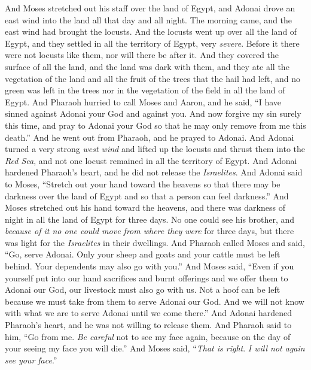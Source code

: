 \begin{biblechapter}
\verse And Moses stretched out his staff over the land of Egypt, and Adonai drove an east wind into the land all that day and all night. The morning came, and the east wind had brought the locusts.
\verse And the locusts went up over all the land of Egypt, and they settled in all the territory of Egypt, very \textit{severe}. Before it there were not locusts like them, nor will there be after it.
\verse And they covered the surface of all the land, and the land was dark with them, and they ate all the vegetation of the land and all the fruit of the trees that the hail had left, and no green was left in the trees nor in the vegetation of the field in all the land of Egypt.
\verse And Pharaoh hurried to call Moses and Aaron, and he said, “I have sinned against Adonai your God and against you.
\verse And now forgive my sin surely this time, and pray to Adonai your God so that he may only remove from me this death.”
\verse And he went out from Pharaoh, and he prayed to Adonai.
\verse And Adonai turned a very strong \textit{west wind} and lifted up the locusts and thrust them into the \textit{Red Sea}, and not one locust remained in all the territory of Egypt.
\verse And Adonai hardened Pharaoh’s heart, and he did not release the \textit{Israelites}.
 And Adonai said to Moses, “Stretch out your hand toward the heavens so that there may be darkness over the land of Egypt and so that a person can feel darkness.”
\verse And Moses stretched out his hand toward the heavens, and there was darkness of night in all the land of Egypt for three days.
\verse No one could see his brother, and \textit{because of it no one could move from where they were} for three days, but there was light for the \textit{Israelites} in their dwellings.
\verse And Pharaoh called Moses and said, “Go, serve Adonai. Only your sheep and goats and your cattle must be left behind. Your dependents may also go with you.”
\verse And Moses said, “Even if you yourself put into our hand sacrifices and burnt offerings and we offer them to Adonai our God,
\verse our livestock must also go with us. Not a hoof can be left because we must take from them to serve Adonai our God. And we will not know with what we are to serve Adonai until we come there.”
\verse And Adonai hardened Pharaoh’s heart, and he was not willing to release them.
\verse And Pharaoh said to him, “Go from me. \textit{Be careful} not to see my face again, because on the day of your seeing my face you will die.”
\verse And Moses said, “\textit{That is right}. \textit{I will not again see your face}.”
\end{biblechapter}

